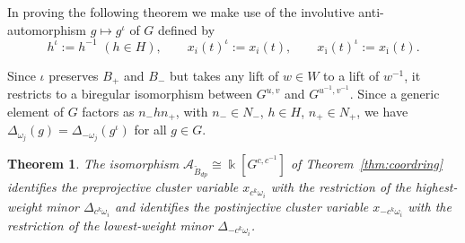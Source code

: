 \documentclass[12pt]{amsart}
\newcommand{\cA}{\mathcal{A}}
\newcommand{\kk}{\Bbbk}
\newcommand{\ol}[1]{\overline{#1}}
\newcommand{\Bdp}{\widetilde{B}_{dp}}
\newtheorem{theorem}{Theorem}[section]
\theoremstyle{remark}
\numberwithin{equation}{section}
\numberwithin{figure}{section}
\begin{document}
In proving the following theorem we make use of the involutive anti-automorphism $g \mapsto g^\iota$ of $G$ defined by
\begin{equation}
  h^\iota := h^{-1}\,\, (h\in H),
  \quad
  \quad
  x_i(t)^\iota := x_i(t),
  \quad
  \quad
  x_{\ol{\imath}}(t)^\iota := x_{\ol{\imath}}(t).
\end{equation}

Since $\iota$ preserves $B_+$ and $B_-$ but takes any lift of $w \in W$ to a lift of $w^{-1}$, it restricts to a biregular isomorphism between $G^{u,v}$ and $G^{u^{-1},v^{-1}}$.
Since a generic element of $G$ factors as $n_- h n_+$, with $n_- \in N_-$, $h \in H$, $n_+ \in N_+$, we have $\Delta_{\omega_j}(g) = \Delta_{-\omega_j}(g^\iota)$ for all $g \in G$.

\begin{theorem}
  \label{thm:mainirregular}
  The isomorphism $\cA_{\Bdp} \cong \kk[G^{c,c^{-1}}]$ of Theorem~\ref{thm:coordring} identifies the preprojective cluster variable $x_{c^k\omega_i}$ with the restriction of the highest-weight minor $\Delta_{c^k\omega_i}$ and identifies the postinjective cluster variable $x_{-c^k \omega_i}$ with the restriction of the lowest-weight minor $\Delta_{-c^k \omega_i}$.
\end{theorem}
\end{document}
